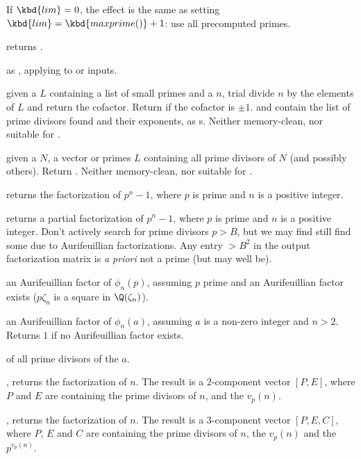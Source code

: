 If $\kbd{lim} = 0$, the effect is the same as setting $\kbd{lim} =
\kbd{maxprime()} + 1$: use all precomputed primes.

returns
.

 as , applying to
 or  inputs.

 given a 
$L$ containing a list of small primes and a  $n$, trial divide
$n$ by the elements of $L$ and return the cofactor. Return  if the
cofactor is $\pm 1$.  and  contain the list of prime divisors
found and their exponents, as s. Neither memory-clean, nor
suitable for .

 given a  $N$, a vector or
primes $L$ containing all prime divisors of $N$ (and possibly others). Return
. Neither memory-clean, nor suitable for .

 returns the factorization of $p^n-1$,
where $p$ is prime and $n$ is a positive integer.

 returns a partial
factorization of $p^n-1$, where $p$ is prime and $n$ is a positive integer.
Don't actively search for prime divisors $p > B$, but we may find still find
some due to Aurifeuillian factorizations. Any entry $> B^2$ in the output
factorization matrix is \emph{a priori} not a prime (but may well be).

 an Aurifeuillian factor
of $\phi_n(p)$, assuming $p$ prime and an Aurifeuillian factor exists
($p \zeta_n$ is a square in $\Q(\zeta_n)$).

 an Aurifeuillian factor of
$\phi_n(a)$, assuming $a$ is a non-zero integer and $n > 2$. Returns $1$
if no Aurifeuillian factor exists.

  of all prime divisors of the
 $a$.

, returns the factorization of $n$. The result
is a $2$-component vector $[P,E]$, where $P$ and $E$ are 
containing the prime divisors of $n$, and the $v_p(n)$.

, returns the factorization of $n$. The result
is a $3$-component vector $[P,E,C]$, where $P$, $E$ and $C$ are
 containing the prime divisors of $n$, the $v_p(n)$
and the $p^{v_p(n)}$.

